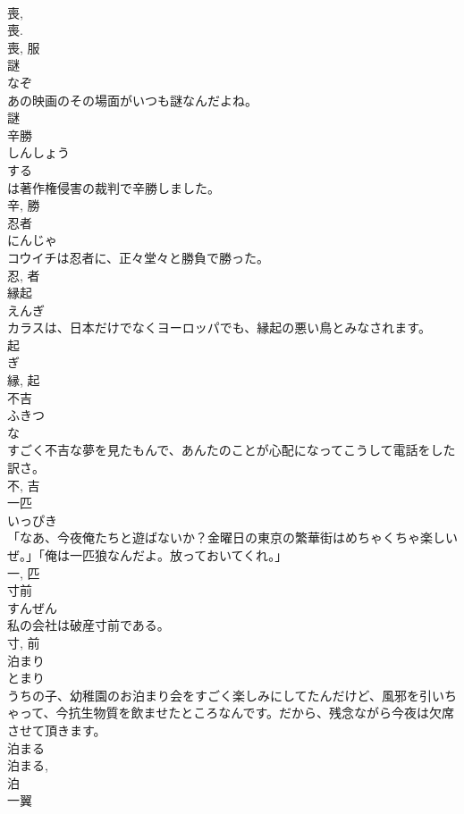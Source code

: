 \documentclass[8pt]{extreport}
\begin{document}
\begin{CJK}{UTF8}{min}
\\	喪, 
\\	喪. 
\\	喪, 服	
\\	謎	
\\	なぞ	
\\	あの映画のその場面がいつも謎なんだよね。	
\\	謎	
\\	辛勝	
\\	しんしょう	
\\	する 
\\	は著作権侵害の裁判で辛勝しました。	
\\	辛, 勝	
\\	忍者	
\\	にんじゃ	
\\	コウイチは忍者に、正々堂々と勝負で勝った。	
\\	忍, 者	
\\	縁起	
\\	えんぎ	
\\	カラスは、日本だけでなくヨーロッパでも、縁起の悪い鳥とみなされます。	
\\	起 
\\	ぎ 
\\	縁, 起	
\\	不吉	
\\	ふきつ	
\\	な 
\\	すごく不吉な夢を見たもんで、あんたのことが心配になってこうして電話をした訳さ。	
\\	不, 吉	
\\	一匹	
\\	いっぴき	
\\	「なあ、今夜俺たちと遊ばないか？金曜日の東京の繁華街はめちゃくちゃ楽しいぜ。」「俺は一匹狼なんだよ。放っておいてくれ。」	
\\	一, 匹	
\\	寸前	
\\	すんぜん	
\\	私の会社は破産寸前である。	
\\	寸, 前	
\\	泊まり	
\\	とまり	
\\	うちの子、幼稚園のお泊まり会をすごく楽しみにしてたんだけど、風邪を引いちゃって、今抗生物質を飲ませたところなんです。だから、残念ながら今夜は欠席させて頂きます。	
\\	泊まる 
\\	泊まる, 
\\	泊	
\\	一翼	

\end{CJK}
\end{document}
